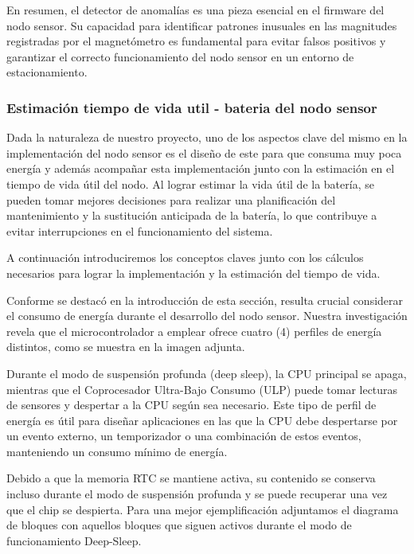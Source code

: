 En resumen, el detector de anomalías es una pieza esencial en el firmware del nodo sensor. Su capacidad para identificar patrones inusuales en las magnitudes registradas por el magnetómetro es fundamental para evitar falsos positivos y garantizar el correcto funcionamiento del nodo sensor en un entorno de estacionamiento.




\subsubsection{Estimación tiempo de vida util - bateria del nodo sensor}{\label{sec:bateria_del_nodo_sensor}}
Dada la naturaleza de nuestro proyecto, uno de los aspectos clave del mismo en la
implementación del nodo sensor es el diseño de este para que consuma muy poca energía y
además acompañar esta implementación junto con la estimación en el tiempo de vida útil
del nodo.
Al lograr estimar la vida útil de la batería, se pueden tomar mejores decisiones para
realizar una planificación del mantenimiento y la sustitución anticipada de la batería,
lo que contribuye a evitar interrupciones en el funcionamiento del sistema.

A continuación introduciremos los conceptos claves junto con los cálculos necesarios
para lograr la implementación y la estimación del tiempo de vida.

Conforme se destacó en la introducción de esta sección, resulta crucial considerar el
consumo de energía durante el desarrollo del nodo sensor. Nuestra investigación revela
que el microcontrolador a emplear ofrece cuatro (4) perfiles de energía distintos, como
se muestra en la imagen adjunta.


Durante el modo de suspensión profunda (deep sleep), la CPU principal se apaga, mientras
que el Coprocesador Ultra-Bajo Consumo (ULP) puede tomar lecturas de sensores y
despertar a la CPU según sea necesario. Este tipo de perfil de energía es útil para
diseñar aplicaciones en las que la CPU debe despertarse por un evento externo, un
temporizador o una combinación de estos eventos, manteniendo un consumo mínimo de
energía.

Debido a que la memoria RTC se mantiene activa, su contenido se conserva incluso durante
el modo de suspensión profunda y se puede recuperar una vez que el chip se despierta.
Para una mejor ejemplificación adjuntamos el diagrama de bloques con aquellos bloques
que siguen activos durante el modo de funcionamiento Deep-Sleep.


